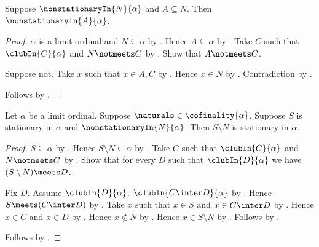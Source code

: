 \begin{proposition}\label{nonstationary_subset}
    Suppose $\nonstationaryIn{N}{\alpha}$ and $A\subseteq N$.
    Then $\nonstationaryIn{A}{\alpha}$.
\end{proposition}
\begin{proof}
    $\alpha$ is a limit ordinal and $N\subseteq\alpha$
        by .
    Hence $A\subseteq\alpha$ by .
    Take $C$ such that $\clubIn{C}{\alpha}$ and $N\notmeets C$
        by .
    Show that $A\notmeets C$.
    \begin{subproof}
        Suppose not.
        Take $x$ such that $x\in A,C$ by .
        Hence $x\in N$ by .
        Contradiction by .
    \end{subproof}
    Follows by .
\end{proof}

\begin{theorem}\label{stationary_remove_nonstationary}
    Let $\alpha$ be a limit ordinal.
    Suppose $\naturals\in\cofinality{\alpha}$.
    Suppose $S$ is stationary in $\alpha$ and
        $\nonstationaryIn{N}{\alpha}$.
    Then $S\setminus N$ is stationary in $\alpha$.
\end{theorem}
\begin{proof}
    $S\subseteq\alpha$ by .
    Hence $S\setminus N\subseteq\alpha$
        by .
    Take $C$ such that $\clubIn{C}{\alpha}$ and $N\notmeets C$
        by .
    Show that for every $D$ such that $\clubIn{D}{\alpha}$
        we have $(S\setminus N)\meets D$.
    \begin{subproof}
        Fix $D$.
        Assume $\clubIn{D}{\alpha}$.
        $\clubIn{C\inter D}{\alpha}$ by .
        Hence $S\meets(C\inter D)$ by .
        Take $x$ such that $x\in S$ and $x\in C\inter D$
            by .
        Hence $x\in C$ and $x\in D$
            by .
        Hence $x\notin N$ by .
        Hence $x\in S\setminus N$ by .
        Follows by .
    \end{subproof}
    Follows by .
\end{proof}

